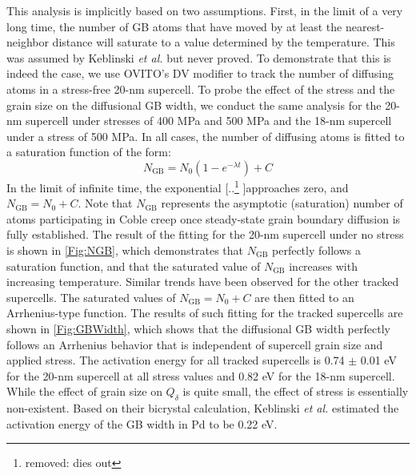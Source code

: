 \documentclass[preprint,12pt,sort&compress]{elsarticle} %
\newcommand{\?}{\stackrel{?}{=}}
\providecommand{\DIFaddtex}[1]{{\sf #1}} %
\providecommand{\DIFdeltex}[1]{{[..\footnote{removed: #1} ]}} %
\providecommand{\DIFaddbegin}{\protect\color{blue}} %
\providecommand{\DIFaddend}{\protect\color{black}} %
\providecommand{\DIFdelbegin}{\protect\color{red}} %
\providecommand{\DIFdelend}{\protect\color{black}} %
\providecommand{\DIFadd}[1]{\texorpdfstring{\DIFaddtex{#1}}{#1}} %
\providecommand{\DIFdel}[1]{\texorpdfstring{\DIFdeltex{#1}}{}} %
\newcommand{\DIFscaledelfig}{0.5}
\newlength{\DIFdelgraphicswidth} %
\newlength{\DIFdelgraphicsheight} %
\newcommand{\DIFaddincludegraphics}[2][]{{\color{blue}\fbox{\DIFOincludegraphics[#1]{#2}}}} %
\newcommand{\DIFdelincludegraphics}[2][]{%
\sbox{\DIFdelgraphicsbox}{\DIFOincludegraphics[#1]{#2}}%
\settoboxwidth{\DIFdelgraphicswidth}{\DIFdelgraphicsbox} %
\settoboxtotalheight{\DIFdelgraphicsheight}{\DIFdelgraphicsbox} %
\scalebox{\DIFscaledelfig}{%
\parbox[b]{\DIFdelgraphicswidth}{\usebox{\DIFdelgraphicsbox}\\[-\baselineskip] \rule{\DIFdelgraphicswidth}{0em}}\llap{\resizebox{\DIFdelgraphicswidth}{\DIFdelgraphicsheight}{%
\setlength{\unitlength}{\DIFdelgraphicswidth}%
\begin{picture}(1,1)%
\thicklines\linethickness{2pt} %
{\color[rgb]{1,0,0}\put(0,0){\framebox(1,1){}}}%
{\color[rgb]{1,0,0}\put(0,0){\line( 1,1){1}}}%
{\color[rgb]{1,0,0}\put(0,1){\line(1,-1){1}}}%
\end{picture}%
}\hspace*{3pt}}} %
} %
\DeclareRobustCommand{\DIFaddbegin}{\DIFOaddbegin \let\includegraphics\DIFaddincludegraphics} %
\DeclareRobustCommand{\DIFaddend}{\DIFOaddend \let\includegraphics\DIFOincludegraphics} %
\DeclareRobustCommand{\DIFdelbegin}{\DIFOdelbegin \let\includegraphics\DIFdelincludegraphics} %
\DeclareRobustCommand{\DIFdelend}{\DIFOaddend \let\includegraphics\DIFOincludegraphics} %
\begin{document}
This analysis is implicitly based on two assumptions. First, in the limit of a very long time, the number of GB atoms that have moved by at least the nearest-neighbor distance will saturate to a value determined by the temperature. This was assumed by Keblinski \textit{et al.} \cite{Keblinski1999} but never proved. To demonstrate that this is indeed the case, we use OVITO's DV modifier to track the number of diffusing atoms in a stress-free 20-nm supercell. To probe the effect of the stress and the grain size on the diffusional GB width, we conduct the same analysis for the 20-nm supercell under stresses of 400 MPa and 500 MPa and the 18-nm supercell under a stress of 500 MPa. In all cases, the number of diffusing atoms is fitted to a saturation function of the form:
\begin{equation}
N_\mathrm{GB} = N_0 \left( 1- e^{- \lambda t} \right) + C
\end{equation}
In the limit of infinite time, the exponential \DIFdelbegin \DIFdel{dies out}\DIFdelend \DIFaddbegin \DIFadd{approaches zero}\DIFaddend , and $N_\mathrm{GB} = N_0 + C$. \DIFaddbegin \DIFadd{Note that $N_\text{GB}$ represents the asymptotic (saturation) number of atoms participating in Coble creep once steady-state grain boundary diffusion is fully established. }\DIFaddend The result of the fitting for the 20-nm supercell under no stress is shown in \cref{Fig:NGB}, which demonstrates that $N_{\mathrm{GB}}$ perfectly follows a saturation function, and that the saturated value of $N_{\mathrm{GB}}$ increases with increasing temperature. Similar trends have been observed for the other tracked supercells. The saturated values of $N_\mathrm{GB} = N_0 + C$ are then fitted to an Arrhenius-type function. The results of such fitting for the tracked supercells are shown in \cref{Fig:GBWidth}, which shows that the diffusional GB width perfectly follows an Arrhenius behavior that is independent of supercell grain size and applied stress. The activation energy for all tracked supercells is 0.74 $\pm$ 0.01 eV for the 20-nm supercell at all stress values and 0.82 eV for the 18-nm supercell. While the effect of grain size on $Q_\delta$ is quite small, the effect of stress is essentially non-existent. Based on their bicrystal calculation, Keblinski \textit{et al.} \cite{Keblinski1999} estimated the activation energy of the GB width in Pd to be 0.22 eV.
\end{document}
